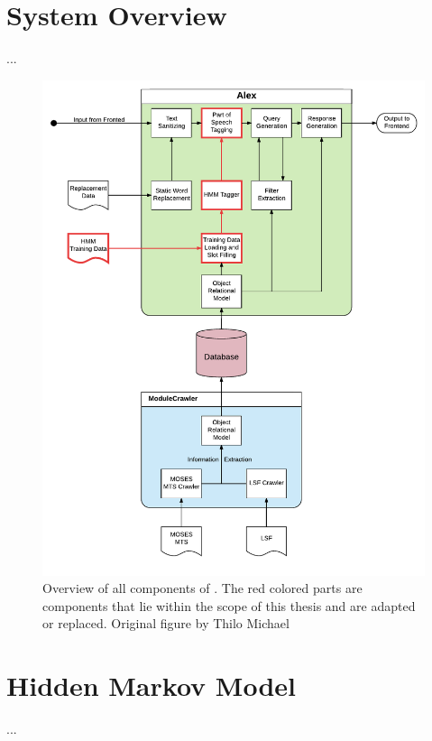 \section{System Overview}\label{c.alex.overview}
...
\begin{figure}[H]
	\includegraphics[width=\textwidth]{images/alex_components}
	\caption{Overview of all components of \Alex. The red colored parts are components that lie within the scope of this thesis and are adapted or replaced. Original figure by Thilo Michael \cite{michael2016}}\label{f.alex_components}
\end{figure}

\section{Hidden Markov Model}\label{c.alex.hmm}
...

